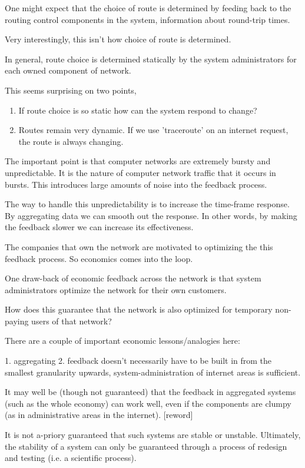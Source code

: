 One might expect that the choice of route is determined by feeding back to the routing control
components in the system, information about round-trip times.

Very interestingly, this isn't how choice of route is determined.

In general, route choice is determined statically by the system administrators for each owned
component of network.  

This seems surprising on two points,

\begin{enumerate}
    \item If route choice is so static how can the system respond to change?
    \item Routes remain very dynamic. If we use 'traceroute' on an internet request, the route is
        always changing.
\end{enumerate}

The important point is that computer networks are extremely bursty and unpredictable. It is the
nature of computer network traffic that it occurs in bursts. This introduces large amounts of noise
into the feedback process. 

The way to handle this unpredictability is to increase the time-frame response. By aggregating data
we can smooth out the response. In other words, by making the feedback slower we can increase its
effectiveness.   

The companies that own the network are motivated to optimizing the this feedback process. So
economics comes into the loop.

One draw-back of economic feedback across the network is that system administrators optimize the
network for their own customers.

How does this guarantee that the network is also optimized for temporary non-paying users of that
network?



There are a couple of important economic lessons/analogies here:

1. aggregating    
2. feedback doesn't necessarily have to be built in from the smallest granularity upwards,
   system-administration of internet areas is sufficient.

It may well be (though not guaranteed) that the feedback in aggregated systems (such as the whole
economy) can work well, even if the components are clumpy (as in administrative areas in the
internet). [reword]

It is not a-priory guaranteed that such systems are stable or unstable. Ultimately, the stability of
a system can only be guaranteed through a process of redesign and testing (i.e. a scientific
process).

